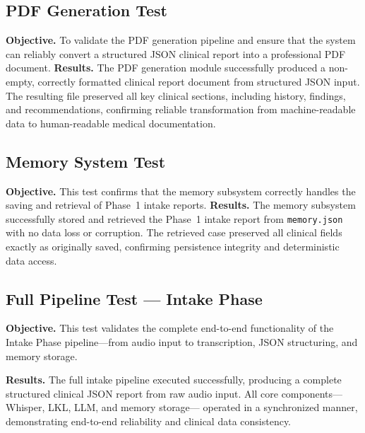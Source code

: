 \subsection{PDF Generation Test}
\label{sec:testing:pdf}

\textbf{Objective.}  
To validate the PDF generation pipeline and ensure that the system can reliably convert
a structured JSON clinical report into a professional PDF document.
\textbf{Results.}
The PDF generation module successfully produced a non-empty, correctly formatted clinical
report document from structured JSON input. The resulting file preserved all key clinical
sections, including history, findings, and recommendations, confirming reliable
transformation from machine-readable data to human-readable medical documentation.



\subsection{Memory System Test}
\label{sec:testing:memory}

\textbf{Objective.}
This test confirms that the memory subsystem correctly handles the saving and retrieval of
Phase~1 intake reports.
\textbf{Results.}
The memory subsystem successfully stored and retrieved the Phase~1 intake report from
\texttt{memory.json} with no data loss or corruption. The retrieved case preserved all
clinical fields exactly as originally saved, confirming persistence integrity and
deterministic data access.


\subsection{Full Pipeline Test — Intake Phase}
\label{sec:testing:full-intake}

\textbf{Objective.}
This test validates the complete end-to-end functionality of the Intake Phase pipeline—from
audio input to transcription, JSON structuring, and memory storage.

\textbf{Results.}
The full intake pipeline executed successfully, producing a complete structured clinical
JSON report from raw audio input. All core components—Whisper, LKL, LLM, and memory storage—
operated in a synchronized manner, demonstrating end-to-end reliability and clinical data
consistency.



